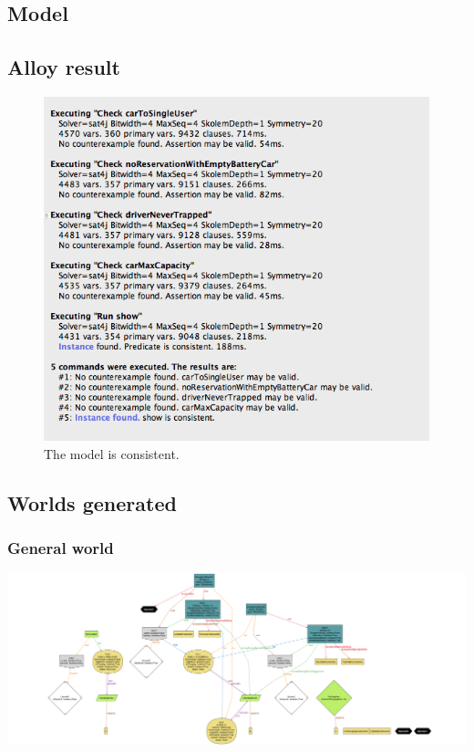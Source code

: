 \subsection{Model}


\subsection{Alloy result}
	\begin{figure}
		\includegraphics[width=\textwidth]{img/alloy_output.png}
		\caption{The model is consistent.}
		\label{figure 1}
	\end{figure}

\subsection{Worlds generated}

	\begin{landscape}
	\subsubsection{General world}
		\includegraphics[width=2\textwidth, center]{img/world1.png}
	\end{landscape}